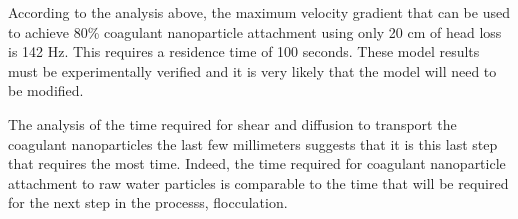 \documentclass[letterpaper,10pt,english]{sphinxmanual}
\begin{document}
\begin{sphinxVerbatim}[commandchars=\\\{\}]
  

  
\end{sphinxVerbatim}

According to the analysis above, the maximum velocity gradient that can be used to achieve 80\% coagulant nanoparticle attachment using only 20 cm of head loss is 142 Hz. This requires a residence time of 100 seconds. These model results must be experimentally verified and it is very likely that the model will need to be modified.

The analysis of the time required for shear and diffusion to transport the coagulant nanoparticles the last few millimeters suggests that it is this last step that requires the most time. Indeed, the time required for coagulant nanoparticle attachment to raw water particles is comparable to the time that will be required for the next step in the processs, flocculation.
\end{document}

